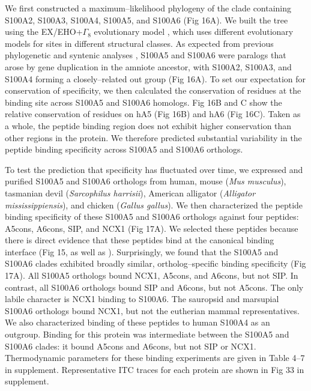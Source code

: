 We first constructed a maximum--likelihood phylogeny of the clade containing
S100A2, S100A3, S100A4, S100A5, and S100A6 (Fig 16A). We built the
tree using the EX/EHO+$\Gamma_{8}$ evolutionary model \citep{le_accounting_2010},
which uses different evolutionary models for sites in different structural
classes. As expected from previous phylogenetic and syntenic analyses
\citep{zimmer_evolution_2013,wheeler_multiple_2016}, S100A5 and S100A6
were paralogs that arose by gene duplication in the amniote ancestor,
with S100A2, S100A3, and S100A4 forming a closely--related out group
(Fig 16A). To set our expectation for conservation of specificity,
we then calculated the conservation of residues at the binding site
across S100A5 and S100A6 homologs. Fig 16B and C show the relative
conservation of residues on hA5 (Fig 16B) and hA6 (Fig 16C). Taken as
a whole, the peptide binding region does not exhibit higher conservation
than other regions in the protein. We therefore predicted substantial
variability in the peptide binding specificity across S100A5 and S100A6
orthologs. 

To test the prediction that specificity has fluctuated over time,
we expressed and purified S100A5 and S100A6 orthologs from human,
mouse (\textit{Mus musculus}), tasmanian devil (\textit{Sarcophilus harrisii}),
American alligator (\textit{Alligator mississippiensis}), and chicken
(\textit{Gallus gallus}). We then characterized the peptide binding
specificity of these S100A5 and S100A6 orthologs against four peptides:
A5cons, A6cons, SIP, and NCX1 (Fig 17A). We selected these peptides
because there is direct evidence that these peptides bind at the canonical
binding interface (Fig 15, as well as \citep{lee_structure_2008,liriano_structure_2012}).
Surprisingly, we found that the S100A5 and S100A6 clades exhibited
broadly similar, ortholog--specific binding specificity (Fig 17A). All
S100A5 orthologs bound NCX1, A5cons, and A6cons, but not SIP. In contrast,
all S100A6 orthologs bound SIP and A6cons, but not A5cons. The only
labile character is NCX1 binding to S100A6. The sauropsid and marsupial
S100A6 orthologs bound NCX1, but not the eutherian mammal representatives.
We also characterized binding of these peptides to human S100A4 as
an outgroup. Binding for this protein was intermediate between the
S100A5 and S100A6 clades: it bound A5cons and A6cons, but not SIP
or NCX1. Thermodynamic parameters for these binding experiments are
given in Table 4--7 in supplement. Representative ITC traces for each protein are
shown in Fig 33 in supplement. 

